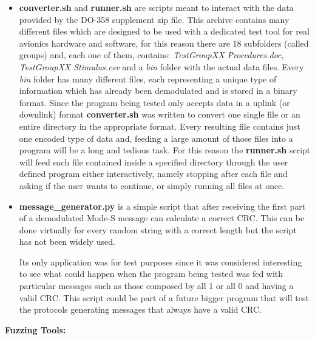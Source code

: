 \documentclass[../main.tex]{subfiles}
\begin{document}
\begin{itemize}

  \item \textbf{converter.sh} and \textbf{runner.sh} are scripts meant to
  interact with the data provided by the DO-358 supplement zip file. This
  archive contains many different files which are designed to be used with a
  dedicated test tool for real avionics hardware and software, for this reason
  there are 18 subfolders (called groups) and,  each one of them, contains:
  \textit{TestGroupXX Procedures.doc}, \textit{TestGroupXX Stimulus.csv} and a
  \textit{bin} folder with the actual data files. Every \textit{bin} folder has
  many different files, each representing a unique type of information which has
  already been demodulated and is stored in a binary format. Since the program
  being tested only accepts data in a uplink (or downlink) format
  \textbf{converter.sh} was written to convert one single file or an entire
  directory in the appropriate format. Every resulting file contains just one
  encoded type of data and, feeding a large amount of those files into a
  program will be a long and tedious task. For this reason the
  \textbf{runner.sh} script will feed each file contained inside a specified
  directory through the user defined program either interactively, namely
  stopping after each file and asking if the user wants to continue, or simply
  running all files at once.

  \item \textbf{message\_generator.py} is a simple script that after receiving
  the first part of a demodulated Mode-S message can calculate a correct CRC.
  This can be done virtually for every random string with a correct length but
  the script has not been widely used.

  Its only application was for test purposes since it was considered interesting
  to see what could happen when the program being tested was fed with particular
  messages such as those composed by all 1 or all 0 and having a valid CRC. This
  script could be part of a future bigger program that will test the protocols
  generating messages that always have a valid CRC.

\end{itemize}

\bigskip
\textbf{Fuzzing Tools:}
\end{document}
